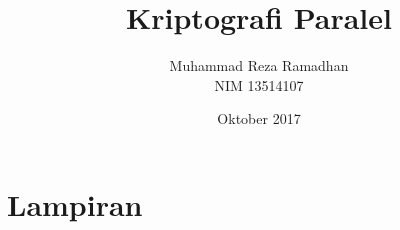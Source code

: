 \documentclass[12pt, onecolumn, oneside, final]{book}
\begin{document}
    \frontmatter
    \title{Kriptografi Paralel}
    \date{Oktober 2017}
    \author{
        Muhammad Reza Ramadhan \\
        NIM 13514107
    }

    
    
    

    \pagestyle{plain}


    \tableofcontents
    \listoffigures
    \listoftables

    \renewcommand{\chaptername}{BAB}
    \renewcommand{\thechapter}{\Roman{chapter}}


    \mainmatter

    
    
    
    
    

    \printbibliography

    \appendix

    \part*{Lampiran}

    
    
\end{document}

